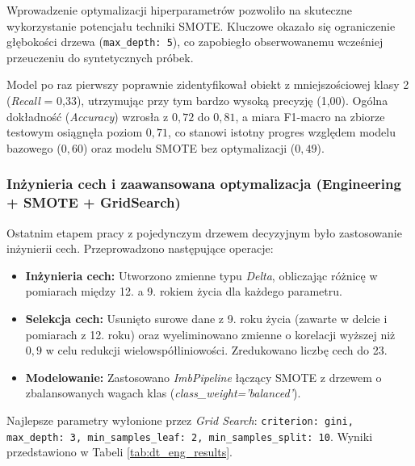 \documentclass[12pt, a4paper]{article}
\begin{document}
Wprowadzenie optymalizacji hiperparametrów pozwoliło na skuteczne wykorzystanie potencjału techniki SMOTE. Kluczowe okazało się ograniczenie głębokości drzewa (\texttt{max\_depth: 5}), co zapobiegło obserwowanemu wcześniej przeuczeniu do syntetycznych próbek. 

Model po raz pierwszy poprawnie zidentyfikował obiekt z mniejszościowej klasy 2 (\textit{Recall} = 0,33), utrzymując przy tym bardzo wysoką precyzję (1,00). Ogólna dokładność (\textit{Accuracy}) wzrosła z $0{,}72$ do $0{,}81$, a miara F1-macro na zbiorze testowym osiągnęła poziom $0{,}71$, co stanowi istotny progres względem modelu bazowego ($0{,}60$) oraz modelu SMOTE bez optymalizacji ($0{,}49$).


\subsubsection*{Inżynieria cech i zaawansowana optymalizacja (Engineering + SMOTE + GridSearch)}

Ostatnim etapem pracy z pojedynczym drzewem decyzyjnym było zastosowanie inżynierii cech. Przeprowadzono następujące operacje:
\begin{itemize}
    \item \textbf{Inżynieria cech:} Utworzono zmienne typu \textit{Delta}, obliczając różnicę w pomiarach między 12. a 9. rokiem życia dla każdego parametru.
    \item \textbf{Selekcja cech:} Usunięto surowe dane z 9. roku życia (zawarte w delcie i pomiarach z 12. roku) oraz wyeliminowano zmienne o korelacji wyższej niż $0,9$ w celu redukcji wielowspółliniowości. Zredukowano liczbę cech do 23.
    \item \textbf{Modelowanie:} Zastosowano \textit{ImbPipeline} łączący SMOTE z drzewem o zbalansowanych wagach klas (\textit{class\_weight='balanced'}).
\end{itemize}

Najlepsze parametry wyłonione przez \textit{Grid Search}: \texttt{criterion: gini, max\_depth: 3, min\_samples\_leaf: 2, min\_samples\_split: 10}. Wyniki przedstawiono w Tabeli \ref{tab:dt_eng_results}.
\end{document}
